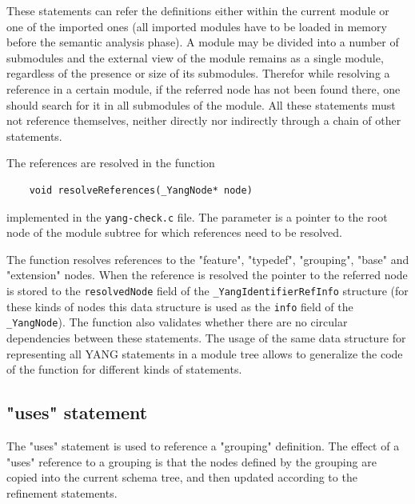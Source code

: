 \documentclass[conference]{IEEEtran}
\begin{document}
These statements can refer the definitions either within the current module or one of the imported ones (all imported modules have to be loaded in memory before the semantic analysis phase). 
A module may be divided into a number of submodules and the external view of the module remains as a single module, regardless of the presence or size of its submodules. 
Therefor while resolving a reference in a certain module, if the referred node has not been found there, one should search for it in all submodules of the module.
All these statements must not reference themselves, neither directly nor indirectly through a chain of other statements.

The references are resolved in the function
\small
\begin{verbatim}
    void resolveReferences(_YangNode* node)
\end{verbatim}
\normalsize
implemented in the \texttt{yang-check.c} file. The parameter is a pointer to the root node of the module subtree for which references need to be resolved.

The function resolves references to the "feature", "typedef", "grouping", "base" and "extension" nodes. 
When the reference is resolved the pointer to the referred node is stored to the \texttt{resolvedNode} field of the \texttt{\_YangIdentifierRefInfo} structure 
(for these kinds of nodes this data structure is used as the \texttt{info} field of the \texttt{\_YangNode}). 
The function also validates whether there are no circular dependencies between these statements. The usage of the same data structure for representing
all YANG statements in a module tree allows to generalize the code of the function for different kinds of statements.  

\subsection{"uses" statement}
The "uses" statement is used to reference a "grouping" definition. The effect of a "uses" reference to a grouping is that the nodes
defined by the grouping are copied into the current schema tree, and then updated according to the refinement statements.
\end{document}
